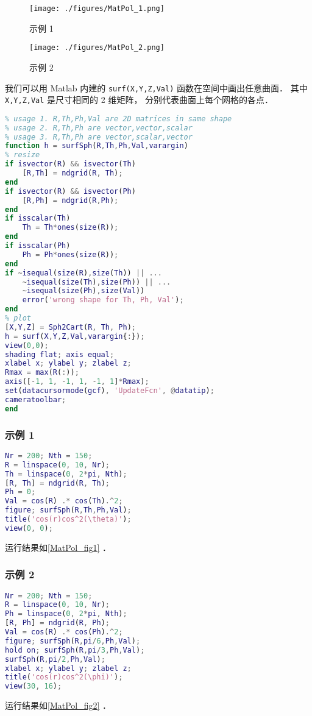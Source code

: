 
\begin{issues}
\issueAbstract
\end{issues}

\begin{figure}[ht]
\centering
\texttt{[image: ./figures/MatPol\_1.png]}
\caption{示例 1} \label{MatPol_fig1}
\end{figure}
\begin{figure}[ht]
\centering
\texttt{[image: ./figures/MatPol\_2.png]}
\caption{示例 2} \label{MatPol_fig2}
\end{figure}

我们可以用 Matlab 内建的 \verb|surf(X,Y,Z,Val)| 函数在空间中画出任意曲面． 其中 \verb|X,Y,Z,Val| 是尺寸相同的 2 维矩阵， 分别代表曲面上每个网格的各点．
\begin{lstlisting}[language=matlab, caption=surfSph.m]
% surf() in spherical coordinate
% usage 1. R,Th,Ph,Val are 2D matrices in same shape
% usage 2. R,Th,Ph are vector,vector,scalar
% usage 3. R,Th,Ph are vector,scalar,vector
function h = surfSph(R,Th,Ph,Val,varargin)
% resize
if isvector(R) && isvector(Th)
    [R,Th] = ndgrid(R, Th);
end
if isvector(R) && isvector(Ph)
    [R,Ph] = ndgrid(R,Ph);
end
if isscalar(Th)
    Th = Th*ones(size(R));
end
if isscalar(Ph)
    Ph = Ph*ones(size(R));
end
if ~isequal(size(R),size(Th)) || ...
    ~isequal(size(Th),size(Ph)) || ...
    ~isequal(size(Ph),size(Val))
    error('wrong shape for Th, Ph, Val');
end
% plot
[X,Y,Z] = Sph2Cart(R, Th, Ph);
h = surf(X,Y,Z,Val,varargin{:});
view(0,0);
shading flat; axis equal;
xlabel x; ylabel y; zlabel z;
Rmax = max(R(:));
axis([-1, 1, -1, 1, -1, 1]*Rmax);
set(datacursormode(gcf), 'UpdateFcn', @datatip);
cameratoolbar;
end
\end{lstlisting}

\subsubsection{示例 1}
\begin{lstlisting}[language=matlab, caption=surfSph\_demo1.m]
Nr = 200; Nth = 150;
R = linspace(0, 10, Nr);
Th = linspace(0, 2*pi, Nth);
[R, Th] = ndgrid(R, Th);
Ph = 0;
Val = cos(R) .* cos(Th).^2;
figure; surfSph(R,Th,Ph,Val);
title('cos(r)cos^2(\theta)');
view(0, 0);
\end{lstlisting}
运行结果如\autoref{MatPol_fig1} ．

\subsubsection{示例 2}
\begin{lstlisting}[language=matlab, caption=surfSph\_demo2.m]
Nr = 200; Nth = 150;
R = linspace(0, 10, Nr);
Ph = linspace(0, 2*pi, Nth);
[R, Ph] = ndgrid(R, Ph);
Val = cos(R) .* cos(Ph).^2;
figure; surfSph(R,pi/6,Ph,Val);
hold on; surfSph(R,pi/3,Ph,Val);
surfSph(R,pi/2,Ph,Val);
xlabel x; ylabel y; zlabel z;
title('cos(r)cos^2(\phi)');
view(30, 16);
\end{lstlisting}
运行结果如\autoref{MatPol_fig2} ．

